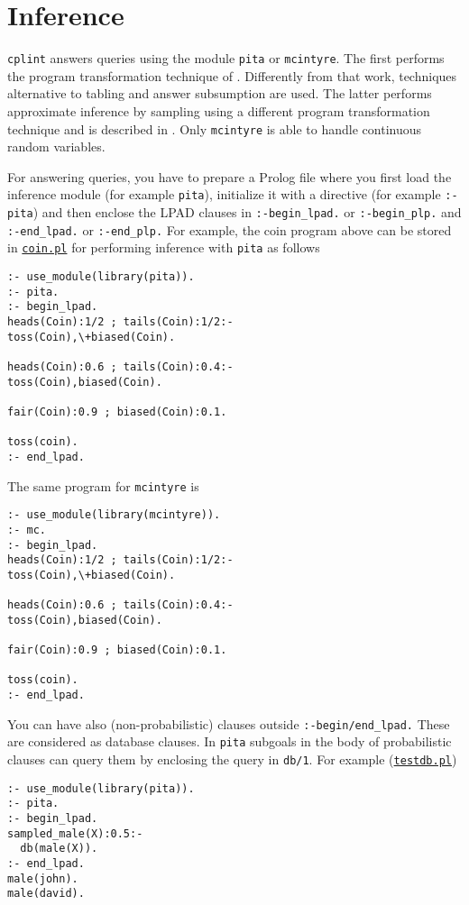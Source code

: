 \section{Inference}
\label{inf}
\texttt{cplint} answers queries using the module \verb|pita| or \verb|mcintyre|. The first performs the program transformation technique of \cite{RigSwi10-ICLP10-IC}. Differently from that work, techniques alternative to tabling and answer subsumption are used. The latter performs approximate inference by sampling
using a different program transformation technique and is described in \cite{Rig13-FI-IJ}. Only \verb|mcintyre| is able to handle continuous
random variables.

For answering queries, you have to prepare a Prolog file where you first load the inference module (for example \verb|pita|), initialize it with a directive (for example \verb|:- pita|) and then enclose the LPAD
clauses in \verb|:-begin_lpad.| or \verb|:-begin_plp.| and \verb|:-end_lpad.| or \verb|:-end_plp.| For example, the coin program above can be stored in \href{http://cplint.lamping.unife.it/example/inference/coin.pl}{\texttt{coin.pl}} for performing inference
with \verb|pita| as follows
\begin{verbatim}
:- use_module(library(pita)).
:- pita.
:- begin_lpad.
heads(Coin):1/2 ; tails(Coin):1/2:- 
toss(Coin),\+biased(Coin).

heads(Coin):0.6 ; tails(Coin):0.4:- 
toss(Coin),biased(Coin).

fair(Coin):0.9 ; biased(Coin):0.1.

toss(coin).
:- end_lpad.
\end{verbatim}
The same program for \verb|mcintyre| is
\begin{verbatim}
:- use_module(library(mcintyre)).
:- mc.
:- begin_lpad.
heads(Coin):1/2 ; tails(Coin):1/2:- 
toss(Coin),\+biased(Coin).

heads(Coin):0.6 ; tails(Coin):0.4:- 
toss(Coin),biased(Coin).

fair(Coin):0.9 ; biased(Coin):0.1.

toss(coin).
:- end_lpad.
\end{verbatim}
You can have also (non-probabilistic) clauses outside \verb|:-begin/end_lpad.| These are considered as database clauses.
In \verb|pita| subgoals in the body of probabilistic clauses can query them by enclosing the query in \verb|db/1|.
For example (\href{http://cplint.lamping.unife.it/example/inference/testdb.pl}{\texttt{testdb.pl}})
\begin{verbatim}
:- use_module(library(pita)).
:- pita.
:- begin_lpad.
sampled_male(X):0.5:-
  db(male(X)).
:- end_lpad.
male(john).
male(david).
\end{verbatim}
